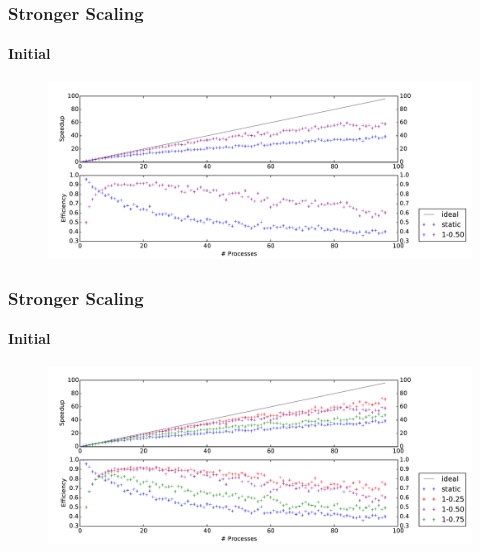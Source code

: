 \begin{frame}
    \frametitle{Stronger Scaling}
    \framesubtitle{Initial}

    \begin{figure}
        \centering
        \includegraphics[width=\textwidth]{content/img/strong_scaling_time_second}
    \end{figure}

\end{frame}

\begin{frame}
    \frametitle{Stronger Scaling}
    \framesubtitle{Initial}

    \begin{figure}
        \centering
        \includegraphics[width=\textwidth]{content/img/strong_scaling_time_initial}
    \end{figure}

\end{frame}

